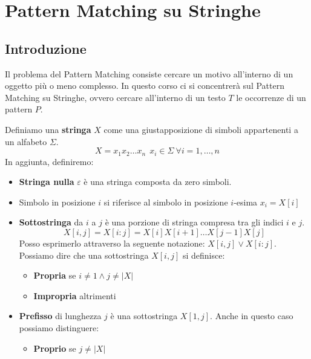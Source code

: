 \chapter{Pattern Matching su Stringhe}
\section{Introduzione}
Il problema del Pattern Matching consiste cercare un motivo all'interno di un oggetto
più o meno complesso. In questo corso ci si concentrerà sul Pattern Matching su
Stringhe, ovvero cercare all'interno di un testo $T$ le occorrenze di un pattern $P$.
\begin{definizione}
    Definiamo una \textbf{stringa} $X$ come una giustapposizione di simboli
    appartenenti a un alfabeto $\Sigma$.
    \begin{equation}
        X=x_1x_2\dots x_n \ \ x_i \in \Sigma \ \forall i = 1, \dots, n
    \end{equation}
    In aggiunta, definiremo:
    \begin{itemize}
        \item \textbf{Stringa nulla} $\varepsilon$ è una stringa composta da
              zero simboli.
        \item Simbolo in posizione $i$ si riferisce al simbolo in posizione
              $i$-esima $x_i = X[i]$
        \item \textbf{Sottostringa} da $i$ a $j$ è una porzione di stringa
              compresa tra gli indici $i$ e $j$.
              \begin{equation}
                  X[i, j] = X[i:j] = X[i]X[i+1]\dots X[j - 1]X[j]
              \end{equation}
              Posso esprimerlo attraverso la seguente notazione: $X[i, j] \lor X[i:j]$.
              Possiamo dire che una sottostringa $X[i, j]$ si definisce:
              \begin{itemize}
                  \item \textbf{Propria} se $i \neq 1 \land j \neq |X|$
                  \item \textbf{Impropria} altrimenti
              \end{itemize}
        \item \textbf{Prefisso} di lunghezza $j$ è una sottostringa $X[1, j]$.
              Anche in questo caso possiamo distinguere:
              \begin{itemize}
                  \item \textbf{Proprio} se $j \neq |X|$

\end{itemize}
\end{itemize}
\end{definizione}
